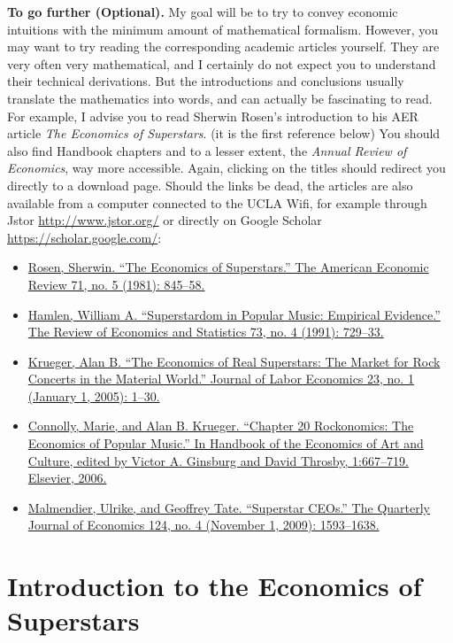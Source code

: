 \documentclass[]{book}
\providecommand{\tightlist}{%
  \setlength{\itemsep}{0pt}\setlength{\parskip}{0pt}}
\theoremstyle{definition}
\theoremstyle{definition}
\theoremstyle{definition}
\theoremstyle{remark}
\begin{document}
\textbf{To go further (Optional).} My goal will be to try to convey
economic intuitions with the minimum amount of mathematical formalism.
However, you may want to try reading the corresponding academic articles
yourself. They are very often very mathematical, and I certainly do not
expect you to understand their technical derivations. But the
introductions and conclusions usually translate the mathematics into
words, and can actually be fascinating to read. For example, I advise
you to read Sherwin Rosen's introduction to his AER article \emph{The
Economics of Superstars}. (it is the first reference below) You should
also find Handbook chapters and to a lesser extent, the \emph{Annual
Review of Economics}, way more accessible. Again, clicking on the titles
should redirect you directly to a download page. Should the links be
dead, the articles are also available from a computer connected to the
UCLA Wifi, for example through Jstor \url{http://www.jstor.org/} or
directly on Google Scholar \url{https://scholar.google.com/}:

\begin{itemize}
\tightlist
\item
  \href{http://www.jstor.org/stable/1803469}{Rosen, Sherwin. ``The
  Economics of Superstars.'' The American Economic Review 71, no. 5
  (1981): 845--58.}
\item
  \href{https://doi.org/10.2307/2109415}{Hamlen, William A.
  ``Superstardom in Popular Music: Empirical Evidence.'' The Review of
  Economics and Statistics 73, no. 4 (1991): 729--33.}
\item
  \href{https://doi.org/10.1086/425431}{Krueger, Alan B. ``The Economics
  of Real Superstars: The Market for Rock Concerts in the Material
  World.'' Journal of Labor Economics 23, no. 1 (January 1, 2005):
  1--30.}
\item
  \href{https://doi.org/10.1016/S1574-0676(06)01020-9}{Connolly, Marie,
  and Alan B. Krueger. ``Chapter 20 Rockonomics: The Economics of
  Popular Music.'' In Handbook of the Economics of Art and Culture,
  edited by Victor A. Ginsburg and David Throsby, 1:667--719. Elsevier,
  2006.}
\item
  \href{https://doi.org/10.1162/qjec.2009.124.4.1593}{Malmendier,
  Ulrike, and Geoffrey Tate. ``Superstar CEOs.'' The Quarterly Journal
  of Economics 124, no. 4 (November 1, 2009): 1593--1638.}
\end{itemize}

\hypertarget{intro-superstars}{\chapter{Introduction to the Economics of
Superstars}\label{intro-superstars}}
\end{document}
